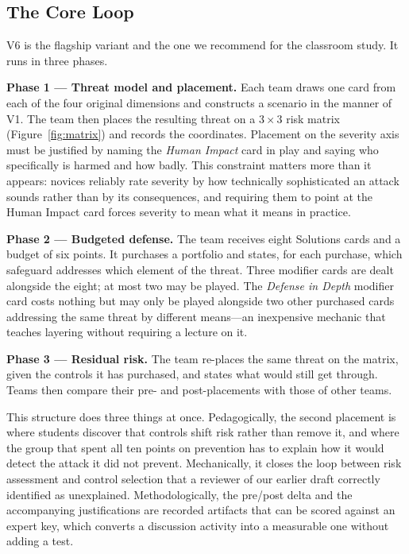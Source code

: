 \documentclass[10pt,twocolumn,letterpaper]{article}
\begin{document}
\subsection{The Core Loop}

V6 is the flagship variant and the one we recommend for the classroom study.
It runs in three phases.

\textbf{Phase 1 --- Threat model and placement.} Each team draws one card from each of
the four original dimensions and constructs a scenario in the manner of V1. The
team then places the resulting threat on a $3 \times 3$ risk matrix
(Figure~\ref{fig:matrix}) and records the coordinates. Placement on the severity
axis must be justified by naming the \emph{Human Impact} card in play and saying
who specifically is harmed and how badly. This constraint matters more than it
appears: novices reliably rate severity by how technically sophisticated an
attack sounds rather than by its consequences, and requiring them to point at
the Human Impact card forces severity to mean what it means in practice.

\textbf{Phase 2 --- Budgeted defense.} The team receives eight Solutions cards
and a budget of six points. It purchases a portfolio and states, for each
purchase, which safeguard addresses which element of the threat. Three modifier
cards are dealt alongside the eight; at most two may be played. The
\emph{Defense in Depth} modifier card costs nothing but may only be played
alongside two other purchased cards addressing the same threat by different
means---an inexpensive mechanic that teaches layering without requiring a
lecture on it.

\textbf{Phase 3 --- Residual risk.} The team re-places the same threat on the
matrix, given the controls it has purchased, and states what would still get
through. Teams then compare their pre- and post-placements with those of other
teams.

This structure does three things at once. Pedagogically, the second placement is
where students discover that controls shift risk rather than remove it, and
where the group that spent all ten points on prevention has to explain how it
would detect the attack it did not prevent. Mechanically, it closes the loop
between risk assessment and control selection that a reviewer of our earlier
draft correctly identified as unexplained. Methodologically, the pre/post delta
and the accompanying justifications are recorded artifacts that can be scored
against an expert key, which converts a discussion activity into a measurable
one without adding a test.
\end{document}
